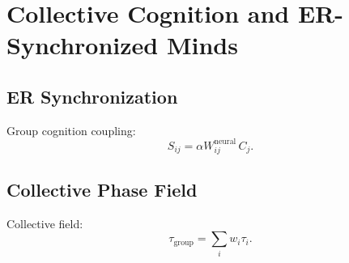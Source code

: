 \chapter{Collective Cognition and ER-Synchronized Minds}

\section{ER Synchronization}
Group cognition coupling:
\[
S_{ij} = \alpha W^{\mathrm{neural}}_{ij}\, C_j.
\]

\section{Collective Phase Field}
Collective field:
\[
\tau_{\mathrm{group}} = \sum_i w_i \tau_i.
\]

